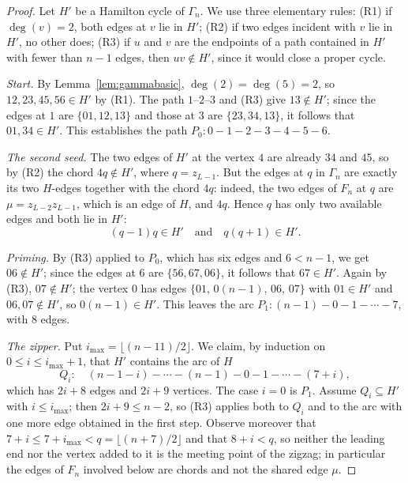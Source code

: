 \documentclass[11pt,a4paper]{article}
\theoremstyle{definition}
\theoremstyle{remark}
\begin{document}
\begin{proof}
Let $H'$ be a Hamilton cycle of $\Gamma_n$. We use three elementary rules: (R1) if $\deg(v)=2$, both edges at $v$ lie in $H'$; (R2) if two edges incident with $v$ lie in $H'$, no other does; (R3) if $u$ and $v$ are the endpoints of a path contained in $H'$ with fewer than $n-1$ edges, then $uv\notin H'$, since it would close a proper cycle.

\emph{Start.} By Lemma~\ref{lem:gammabasic}, $\deg(2)=\deg(5)=2$, so $12,23,45,56\in H'$ by (R1). The path $1$--$2$--$3$ and (R3) give $13\notin H'$; since the edges at $1$ are $\{01,12,13\}$ and those at $3$ are $\{23,34,13\}$, it follows that $01,34\in H'$. This establishes the path $P_0:0-1-2-3-4-5-6$.

\emph{The second seed.} The two edges of $H'$ at the vertex $4$ are already $34$ and $45$, so by (R2) the chord $4q\notin H'$, where $q=z_{L-1}$. But the edges at $q$ in $\Gamma_n$ are exactly its two $H$-edges together with the chord $4q$: indeed, the two edges of $F_n$ at $q$ are $\mu=z_{L-2}z_{L-1}$, which is an edge of $H$, and $4q$. Hence $q$ has only two available edges and both lie in $H'$:
\begin{equation}\label{eq:seed2}
(q-1)q\in H'\quad\text{and}\quad q(q+1)\in H'.
\end{equation}

\emph{Priming.} By (R3) applied to $P_0$, which has six edges and $6<n-1$, we get $06\notin H'$; since the edges at $6$ are $\{56,67,06\}$, it follows that $67\in H'$. Again by (R3), $07\notin H'$; the vertex $0$ has edges $\{01,\,0(n{-}1),\,06,\,07\}$ with $01\in H'$ and $06,07\notin H'$, so $0(n{-}1)\in H'$. This leaves the arc $P_1:(n-1)-0-1-\cdots-7$, with $8$ edges.

\emph{The zipper.} Put $i_{\max}=\lfloor (n-11)/2\rfloor$. We claim, by induction on $0\le i\le i_{\max}+1$, that $H'$ contains the arc of $H$
\[
Q_i:\quad (n-1-i)-\cdots-(n-1)-0-1-\cdots-(7+i),
\]
which has $2i+8$ edges and $2i+9$ vertices. The case $i=0$ is $P_1$. Assume $Q_i\subseteq H'$ with $i\le i_{\max}$; then $2i+9\le n-2$, so (R3) applies both to $Q_i$ and to the arc with one more edge obtained in the first step. Observe moreover that $7+i\le 7+i_{\max}<q=\lfloor (n+7)/2\rfloor$ and that $8+i<q$, so neither the leading end nor the vertex added to it is the meeting point of the zigzag; in particular the edges of $F_n$ involved below are chords and not the shared edge $\mu$.


\end{proof}
\end{document}
